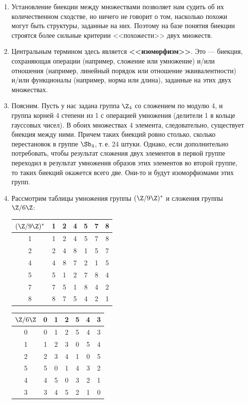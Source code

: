 \begin{enumerate}
\item Установление биекции между множествами позволяет нам судить об их количественном сходстве, но ничего не говорит о том, насколько похожи могут быть структуры, заданные на них. Поэтому на базе понятия биекции строятся более сильные критерии <<похожести>> двух множеств.
\item Центральным термином здесь является \textbf{<<изоморфизм>>}. Это --- биекция, сохраняющая операции (например, сложение или умножение) и/или отношения (например, линейный порядок или отношение эквивалентности) и/или функционалы (например, норма или длина), заданные на этих двух множествах.
\item Поясним. Пусть у нас задана группа $\Z_4$ со сложением по модулю 4, и группа корней 4 степени из 1 с операцией умножения (делители 1 в кольце гауссовых чисел). В обоих множествах 4 элемента, следовательно, существует биекция между ними. Причем таких биекций ровно столько, сколько перестановок в группе $\Sb_4$, т.\,е. 24 штуки. Однако, если дополнительно потребовать, чтобы результат сложения двух элементов в первой группе переходил в результат умножения образов этих элементов во второй группе, то таких биекций окажется всего две. Они-то и будут изоморфизмами этих групп.

\item Рассмотрим таблицы умножения группы $(\Z/9\Z)^*$ и сложения группы $\Z/6\Z$:

\begin{center}
\begin{tabular}{c|cccccc}
$(\Z/9\Z)^*$ & 1 & 2 & 4 & 5 & 7 & 8\\  \hline
1 & 1 & 2 & 4 & 5 & 7 & 8\\
2 & 2 & 4 & 8 & 1 & 5 & 7\\
4 & 4 & 8 & 7 & 2 & 1 & 5\\
5 & 5 & 1 & 2 & 7 & 8 & 4\\
7 & 7 & 5 & 1 & 8 & 4 & 2\\
8 & 8 & 7 & 5 & 4 & 2 & 1
\end{tabular}
\qquad
\begin{tabular}{c|cccccc}
$\Z/6\Z$ & 0 & 1 & 2 & 5 & 4 & 3\\  \hline
0 & 0 & 1 & 2 & 5 & 4 & 3\\
1 & 1 & 2 & 3 & 0 & 5 & 4\\
2 & 2 & 3 & 4 & 1 & 0 & 5\\
5 & 5 & 0 & 1 & 4 & 3 & 2\\
4 & 4 & 5 & 0 & 3 & 2 & 1\\
3 & 3 & 4 & 5 & 2 & 1 & 0
\end{tabular}
\end{center}


\end{enumerate}
